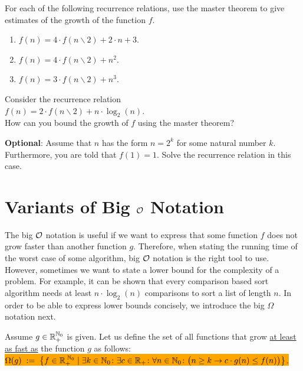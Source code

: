 \exercise
For each of the following recurrence relations, use the master theorem to give estimates of the
growth of the function $f$. 
\begin{enumerate}
\item $f(n) = 4 \cdot f(n \backslash 2) + 2 \cdot n + 3$.
\item $f(n) = 4 \cdot f(n \backslash 2) + n^2$.
\item $f(n) = 3 \cdot f(n \backslash 2) + n^3$.  \eox
\end{enumerate}



\exercise
Consider the recurrence relation
\\[0.2cm]
\hspace*{1.3cm}
$f(n) = 2 \cdot f(n \backslash 2) + n \cdot \log_2(n)$.
\\[0.2cm] 
How can you bound the growth of $f$ using the master theorem? 
\vspace*{0.1cm}

\noindent
\textbf{Optional}: Assume that $n$ has the form $n = 2^k$ for some natural number $k$.
Furthermore, you are told that $f(1) = 1$.  Solve the recurrence relation in this case.
\eox

\section{Variants of Big $\mathcal{O}$ Notation}
The big $\mathcal{O}$ notation is useful if we want to express that some function $f$ does not grow faster
than another function $g$.  Therefore, when stating the running time of the worst case of some algorithm,
big $\mathcal{O}$ notation is the right tool to use.  However, sometimes we want to state a lower bound for
the complexity of a problem.  For example, it can be shown that every comparison based sort algorithm needs at least
$n \cdot \log_2(n)$ comparisons to sort a list of length $n$.  In order to be able to express lower
bounds concisely, we introduce the big $\Omega$ notation next.
\pagebreak

\begin{Definition}[$\Omega(g)$] 
  Assume $g \in {\mathbb R}_+^{{\mathbb N}_0}$ is given.   Let us define the set of all functions that grow 
  \underline{at least as fast as} the function $g$ as follows:
  \\[0.2cm]
  \hspace*{0.5cm} 
  \colorbox{orange}{
  $ \Omega(g) \;:=\; \bigl\{ f \in {\mathbb R}_+^{\;{\mathbb N}_0} \mid \exists k \in {\mathbb N}_0 \colon 
    \exists c \in {\mathbb R}_+\colon \forall n \in {\mathbb N}_0 \colon\bigl(n \geq k \rightarrow c \cdot g(n) \leq f(n)\bigr)\bigr\}$.}
  \eox
\end{Definition}

